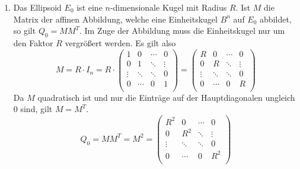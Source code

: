 \documentclass[a4paper]{scrartcl}
\begin{document}
\begin{enumerate}[label=\bfseries\arabic*.]
\begin{enumerate}
            \item
                Das Ellipsoid $E_0$ ist eine $n$-dimensionale Kugel mit Radius
                $R$.
                Ist $M$ die Matrix der affinen Abbildung, welche eine
                Einheitskugel $B^n$ auf $E_0$ abbildet, so gilt $Q_0 = MM^T$.
                Im Zuge der Abbildung muss die Einheitskugel nur um den Faktor
                $R$ vergrößert werden.
                Es gilt also
                \begin{equation}
                    M = R \cdot I_n =
                    R \cdot
                    \begin{pmatrix}
                        1      & 0      & \cdots & 0      \\
                        0      & 1      & \ddots & \vdots \\
                        \vdots & \ddots & \ddots & 0      \\
                        0      & \cdots & 0      & 1      \\
                    \end{pmatrix}
                    =
                    \begin{pmatrix}
                        R      & 0      & \cdots & 0      \\
                        0      & R      & \ddots & \vdots \\
                        \vdots & \ddots & \ddots & 0      \\
                        0      & \cdots & 0      & R      \\
                    \end{pmatrix}
                \end{equation}
                Da $M$ quadratisch ist und nur die Einträge auf der
                Hauptdiagonalen ungleich 0 sind, gilt $M = M^T$.
                \begin{equation}
                    Q_0 = MM^T = M^2 =
                    \begin{pmatrix}
                        R^2    & 0      & \cdots & 0      \\
                        0      & R^2    & \ddots & \vdots \\
                        \vdots & \ddots & \ddots & 0      \\
                        0      & \cdots & 0      & R^2    \\
                    \end{pmatrix}
                \end{equation}
                

\end{enumerate}
\end{enumerate}
\end{document}
